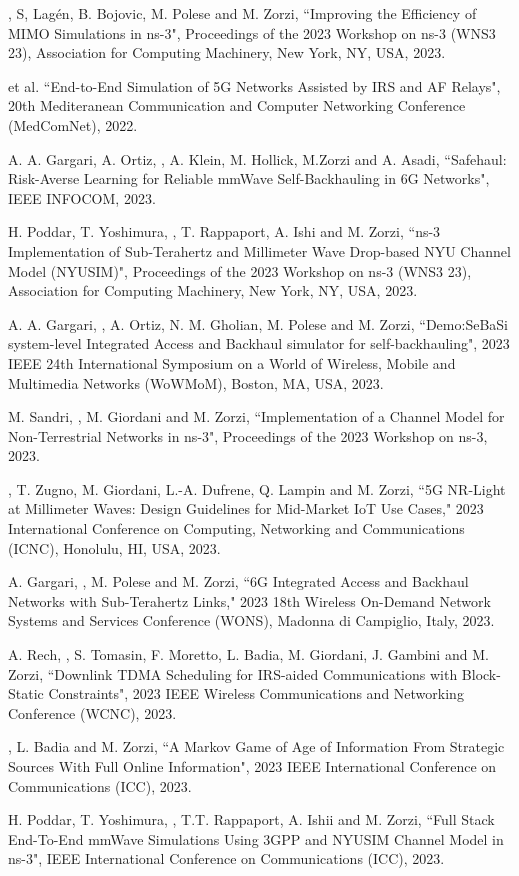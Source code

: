 \begin{enumerate}[label={[C\arabic*]}]
    \item \myself, S, Lagén, B. Bojovic, M. Polese and M. Zorzi, ``Improving the Efficiency of MIMO Simulations in ns-3", Proceedings of the 2023 Workshop on ns-3 (WNS3 23), Association for Computing Machinery, New York, NY, USA, 2023.
    \item \myself{} et al. ``End-to-End Simulation of 5G Networks Assisted by IRS and AF Relays", 20th Mediteranean Communication and Computer Networking Conference (MedComNet), 2022.
    \item A. A. Gargari, A. Ortiz, \myself, A. Klein, M. Hollick, M.Zorzi and A. Asadi, ``Safehaul: Risk-Averse Learning for Reliable mmWave Self-Backhauling in 6G Networks", IEEE INFOCOM, 2023.
    \item H. Poddar, T. Yoshimura, \myself, T. Rappaport, A. Ishi and M. Zorzi, ``ns-3 Implementation of Sub-Terahertz and Millimeter Wave Drop-based NYU Channel Model (NYUSIM)", Proceedings of the 2023 Workshop on ns-3 (WNS3 23), Association for Computing Machinery, New York, NY, USA, 2023.
    \item A. A. Gargari, \myself, A. Ortiz, N. M. Gholian, M. Polese and M. Zorzi, ``Demo:SeBaSi system-level Integrated Access and Backhaul simulator for self-backhauling", 2023 IEEE 24th International Symposium on a World of Wireless, Mobile and Multimedia Networks (WoWMoM), Boston, MA, USA, 2023.
    \item M. Sandri, \myself, M. Giordani and M. Zorzi, ``Implementation of a Channel Model for Non-Terrestrial Networks in ns-3", Proceedings of the 2023 Workshop on ns-3, 2023.
    \item \myself, T. Zugno, M. Giordani, L.-A. Dufrene, Q. Lampin and M. Zorzi, ``5G NR-Light at Millimeter Waves: Design Guidelines for Mid-Market IoT Use Cases," 2023 International Conference on Computing, Networking and Communications (ICNC), Honolulu, HI, USA, 2023.
    \item A. Gargari, \myself, M. Polese and M. Zorzi, ``6G Integrated Access and Backhaul Networks with Sub-Terahertz Links," 2023 18th Wireless On-Demand Network Systems and Services Conference (WONS), Madonna di Campiglio, Italy, 2023.
    \item A. Rech, \myself, S. Tomasin, F. Moretto, L. Badia, M. Giordani, J. Gambini and M. Zorzi, ``Downlink TDMA Scheduling for IRS-aided Communications with Block-Static Constraints", 2023 IEEE Wireless Communications and Networking Conference (WCNC), 2023.
    \item \myself, L. Badia and M. Zorzi, ``A Markov Game of Age of Information From Strategic Sources With Full Online Information", 2023 IEEE International Conference on Communications (ICC), 2023.
    \item H. Poddar, T. Yoshimura, \myself, T.T. Rappaport, A. Ishii and M. Zorzi, ``Full Stack End-To-End mmWave Simulations Using 3GPP and NYUSIM Channel Model in ns-3", IEEE International Conference on Communications (ICC), 2023.
\end{enumerate}